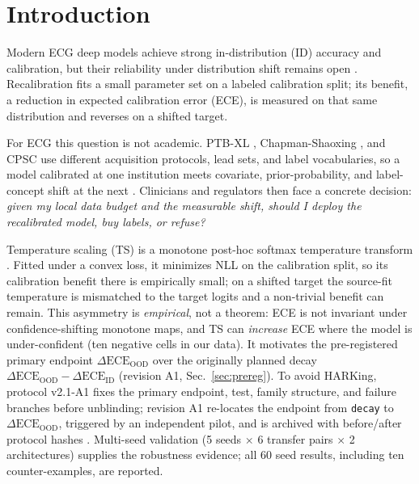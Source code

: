 \documentclass[review,12pt,nonatbib]{elsarticle}
\begin{document}


\section{Introduction}
\label{sec:intro}
Modern ECG deep models achieve strong in-distribution (ID) accuracy and
calibration, but their reliability under distribution shift remains open
\cite{ovadia2019calibration,guo2017calibration,wagner2020ptbxl}.
Recalibration fits a small parameter set on a labeled calibration split;
its benefit, a reduction in expected calibration error (ECE), is measured
on that same distribution and reverses on a shifted target.

For ECG this question is not academic. PTB-XL \cite{wagner2020ptbxl},
Chapman-Shaoxing \cite{zheng2022ecgarrhythmia}, and CPSC use different
acquisition protocols, lead sets, and label vocabularies, so a model
calibrated at one institution meets covariate, prior-probability, and
label-concept shift at the next \cite{morenotorres2012}. Clinicians and
regulators then face a concrete decision: \emph{given my local data budget
and the measurable shift, should I deploy the recalibrated model, buy
labels, or refuse?}

Temperature scaling (TS) is a monotone post-hoc softmax temperature
transform \cite{guo2017calibration}. Fitted under a convex loss, it
minimizes NLL on the calibration split, so its calibration benefit there
is empirically small; on a shifted target the source-fit temperature is
mismatched to the target logits and a non-trivial benefit can remain.
This asymmetry is \emph{empirical}, not a theorem: ECE is not invariant
under confidence-shifting monotone maps, and TS can \emph{increase} ECE
where the model is under-confident (ten negative cells in our data). It
motivates the pre-registered primary endpoint
$\Delta\text{ECE}_{\text{OOD}}$ over the originally planned decay
$\Delta\text{ECE}_{\text{OOD}}-\Delta\text{ECE}_{\text{ID}}$ (revision A1,
Sec.~\ref{sec:prereg}). To avoid HARKing, protocol v2.1-A1
\cite{protocolv21a1} fixes the primary endpoint, test, family structure,
and failure branches before unblinding; revision A1 re-locates the
endpoint from \texttt{decay} to $\Delta\text{ECE}_{\text{OOD}}$, triggered
by an independent pilot, and is archived with before/after protocol hashes
\cite{nosek2019prereg,lakens2019prereg}. Multi-seed validation
(5 seeds $\times$ 6 transfer pairs $\times$ 2 architectures) supplies the
robustness evidence; all 60 seed results, including ten counter-examples,
are reported.
\end{document}

